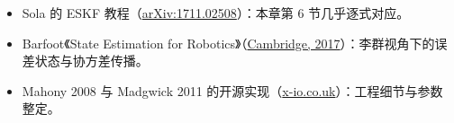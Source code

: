 \begin{reading}

\begin{itemize}
  \item Sola 的 ESKF 教程（\href{https://arxiv.org/abs/1711.02508}{arXiv:1711.02508}）：本章第 6 节几乎逐式对应。
  \item Barfoot《State Estimation for Robotics》（\href{https://books.google.com/books?id=jfZFDwAAQBAJ}{Cambridge, 2017}）：李群视角下的误差状态与协方差传播。
  \item Mahony 2008 与 Madgwick 2011 的开源实现（\href{https://x-io.co.uk/open-source-imu-and-ahrs-algorithms/}{x-io.co.uk}）：工程细节与参数整定。
\end{itemize}


\end{reading}
